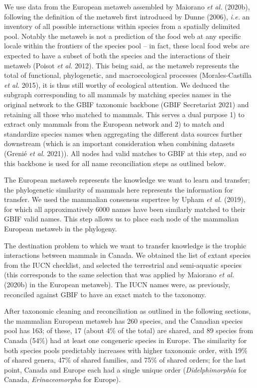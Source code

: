 \documentclass[11pt]{article}
\begin{document}
We use data from the European metaweb assembled by Maiorano \emph{et
al.} (2020b), following the definition of the metaweb first introduced
by Dunne (2006), \emph{i.e.} an inventory of all possible interactions
within species from a spatially delimited pool. Notably the metaweb is
not a prediction of the food web at any specific locale within the
frontiers of the species pool -- in fact, these local food webs are
expected to have a subset of both the species and the interactions of
their metaweb (Poisot \emph{et al.} 2012). This being said, as the
metaweb represents the total of functional, phylogenetic, and
macroecological processes (Morales-Castilla \emph{et al.} 2015), it is
thus still worthy of ecological attention. We deduced the subgraph
corresponding to all mammals by matching species names in the original
network to the GBIF taxonomic backbone (GBIF Secretariat 2021) and
retaining all those who matched to mammals. This serves a dual purpose
1) to extract only mammals from the European network and 2) to match and
standardize species names when aggregating the different data sources
further downstream (which is an important consideration when combining
datasets (Grenié \emph{et al.} 2021)). All nodes had valid matches to
GBIF at this step, and so this backbone is used for all name
reconciliation steps as outlined below.

The European metaweb represents the knowledge we want to learn and
transfer; the phylogenetic similarity of mammals here represents the
information for transfer. We used the mammalian consensus supertree by
Upham \emph{et al.} (2019), for which all approximatively 6000 names
have been similarly matched to their GBIF valid names. This step allows
us to place each node of the mammalian European metaweb in the
phylogeny.

The destination problem to which we want to transfer knowledge is the
trophic interactions between mammals in Canada. We obtained the list of
extant species from the IUCN checklist, and selected the terrestrial and
semi-aquatic species (this corresponds to the same selection that was
applied by Maiorano \emph{et al.} (2020b) in the European metaweb). The
IUCN names were, as previously, reconciled against GBIF to have an exact
match to the taxonomy.

After taxonomic cleaning and reconciliation as outlined in the following
sections, the mammalian European metaweb has 260 species, and the
Canadian species pool has 163; of these, 17 (about 4\% of the total) are
shared, and 89 species from Canada (54\%) had at least one congeneric
species in Europe. The similarity for both species pools predictably
increases with higher taxonomic order, with 19\% of shared genera, 47\%
of shared families, and 75\% of shared orders; for the last point,
Canada and Europe each had a single unique order (\emph{Didelphimorphia}
for Canada, \emph{Erinaceomorpha} for Europe).
\end{document}
